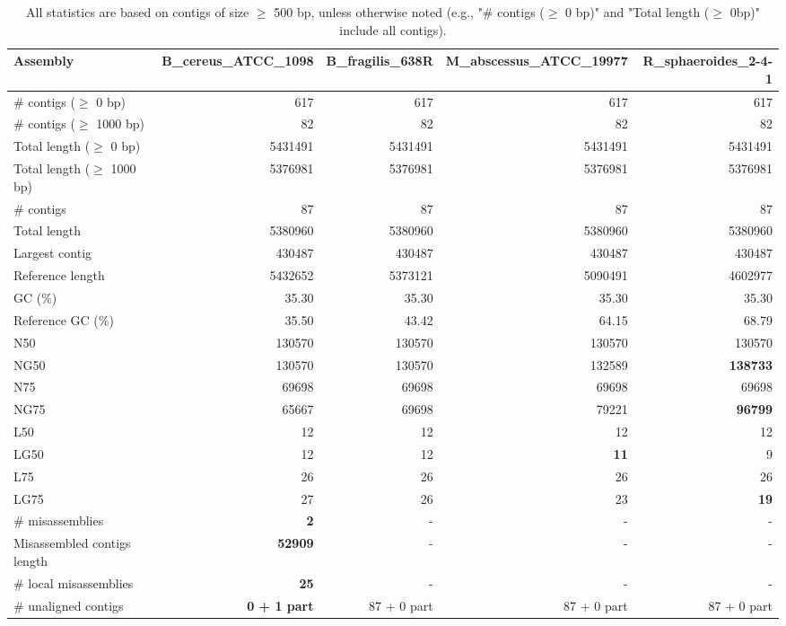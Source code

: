 \documentclass[12pt,a4paper]{article}
\begin{document}
\begin{table}[ht]
\begin{center}
\caption{All statistics are based on contigs of size $\geq$ 500 bp, unless otherwise noted (e.g., "\# contigs ($\geq$ 0 bp)" and "Total length ($\geq$ 0bp)" include all contigs).}
\begin{tabular}{|l*{4}{|r}|}
\hline
Assembly & B\_cereus\_ATCC\_1098 & B\_fragilis\_638R & M\_abscessus\_ATCC\_19977 & R\_sphaeroides\_2-4-1 \\ \hline
\# contigs ($\geq$ 0 bp) & 617 & 617 & 617 & 617 \\ \hline
\# contigs ($\geq$ 1000 bp) & 82 & 82 & 82 & 82 \\ \hline
Total length ($\geq$ 0 bp) & 5431491 & 5431491 & 5431491 & 5431491 \\ \hline
Total length ($\geq$ 1000 bp) & 5376981 & 5376981 & 5376981 & 5376981 \\ \hline
\# contigs & 87 & 87 & 87 & 87 \\ \hline
Total length & 5380960 & 5380960 & 5380960 & 5380960 \\ \hline
Largest contig & 430487 & 430487 & 430487 & 430487 \\ \hline
Reference length & 5432652 & 5373121 & 5090491 & 4602977 \\ \hline
GC (\%) & 35.30 & 35.30 & 35.30 & 35.30 \\ \hline
Reference GC (\%) & 35.50 & 43.42 & 64.15 & 68.79 \\ \hline
N50 & 130570 & 130570 & 130570 & 130570 \\ \hline
NG50 & 130570 & 130570 & 132589 & {\bf 138733} \\ \hline
N75 & 69698 & 69698 & 69698 & 69698 \\ \hline
NG75 & 65667 & 69698 & 79221 & {\bf 96799} \\ \hline
L50 & 12 & 12 & 12 & 12 \\ \hline
LG50 & 12 & 12 & {\bf 11} & 9 \\ \hline
L75 & 26 & 26 & 26 & 26 \\ \hline
LG75 & 27 & 26 & 23 & {\bf 19} \\ \hline
\# misassemblies & {\bf 2} & - & - & - \\ \hline
Misassembled contigs length & {\bf 52909} & - & - & - \\ \hline
\# local misassemblies & {\bf 25} & - & - & - \\ \hline
\# unaligned contigs & {\bf 0 + 1 part} & 87 + 0 part & 87 + 0 part & 87 + 0 part \\ \hline

\end{tabular}
\end{center}
\end{table}
\end{document}
